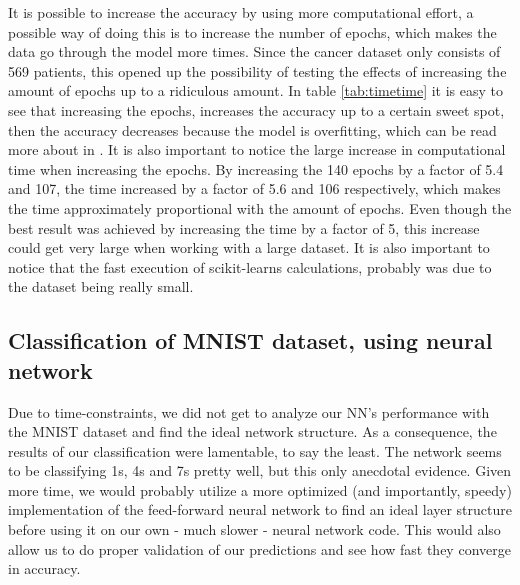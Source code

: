 \documentclass[../main.tex]{subfiles}
\begin{document}
It is possible to increase the accuracy by using more computational effort, a possible way of doing this is to increase the number of epochs, which makes the data go through the model more times. Since the cancer dataset only consists of 569 patients, this opened up the possibility of testing the effects of increasing the amount of epochs up to a ridiculous amount. In table \ref{tab:timetime} it is easy to see that increasing the epochs, increases the accuracy up to a certain sweet spot, then the accuracy decreases because the model is overfitting, which can be read more about in \cite{project1}. It is also important to notice the large increase in computational time when increasing the epochs. By increasing the 140 epochs by a factor of 5.4 and 107, the time increased by a factor of 5.6 and 106 respectively, which makes the time approximately proportional with the amount of epochs. Even though the best result was achieved by increasing the time by a factor of 5, this increase could get very large when working with a large dataset. It is also important to notice that the fast execution of scikit-learns calculations, probably was due to the dataset being really small.

\subsection{Classification of MNIST dataset, using neural network}
Due to time-constraints, we did not get to analyze our NN's performance with the MNIST dataset and find the ideal network structure. As a consequence, the results of our classification were lamentable, to say the least. The network seems to be classifying 1s, 4s and 7s pretty well, but this only anecdotal evidence. Given more time, we would probably utilize a more optimized (and importantly, speedy) implementation of the feed-forward neural network to find an ideal layer structure before using it on our own - much slower - neural network code. This would also allow us to do proper validation of our predictions and see how fast they converge in accuracy.
\end{document}
